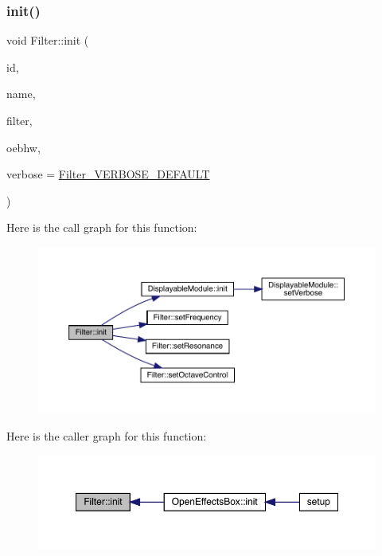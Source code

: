 \subsubsection{\texorpdfstring{init()}{init()}}
{\footnotesize\ttfamily void Filter\+::init (\begin{DoxyParamCaption}\item[{int}]{id,  }\item[{char $\ast$}]{name,  }\item[{Audio\+Filter\+State\+Variable $\ast$}]{filter,  }\item[{\mbox{\hyperlink{class_open_effects_box_h_w}{Open\+Effects\+Box\+HW}} $\ast$}]{oebhw,  }\item[{int}]{verbose = {\ttfamily \mbox{\hyperlink{_filter_8h_aeedb664ae18205202837764d021883e7}{Filter\+\_\+\+V\+E\+R\+B\+O\+S\+E\+\_\+\+D\+E\+F\+A\+U\+LT}}} }\end{DoxyParamCaption})}

Here is the call graph for this function\+:\nopagebreak
\begin{figure}[H]
\begin{center}
\leavevmode
\includegraphics[width=350pt]{class_filter_acff0d2a488a223caa11d48a6147c7feb_cgraph}
\end{center}
\end{figure}
Here is the caller graph for this function\+:\nopagebreak
\begin{figure}[H]
\begin{center}
\leavevmode
\includegraphics[width=350pt]{class_filter_acff0d2a488a223caa11d48a6147c7feb_icgraph}
\end{center}
\end{figure}
\mbox{\label{class_filter_a9cdce58ac2fe0b8beb6d561ab3725041}} 
